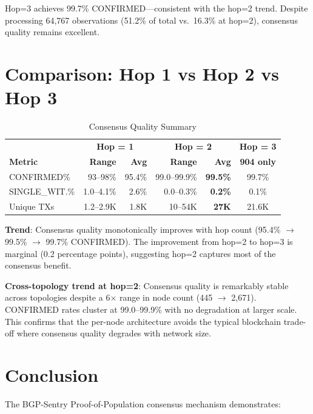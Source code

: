\documentclass[11pt,a4paper]{article}
\begin{document}
Hop=3 achieves 99.7\% CONFIRMED---consistent with the hop=2 trend. Despite
processing 64,767 observations (51.2\% of total vs.\ 16.3\% at hop=2), consensus
quality remains excellent.

\section{Comparison: Hop 1 vs Hop 2 vs Hop 3}

\begin{table}[H]
\centering
\caption{Consensus Quality Summary}
\begin{tabular}{lrrrrrr}
\toprule
 & \multicolumn{2}{c}{\textbf{Hop = 1}} & \multicolumn{2}{c}{\textbf{Hop = 2}} & \multicolumn{2}{c}{\textbf{Hop = 3}} \\
\textbf{Metric} & \textbf{Range} & \textbf{Avg} & \textbf{Range} & \textbf{Avg} & \multicolumn{2}{c}{\textbf{904 only}} \\
\midrule
CONFIRMED\%       & 93--98\% & 95.4\% & 99.0--99.9\% & \textbf{99.5\%} & \multicolumn{2}{c}{99.7\%} \\
SINGLE\_WIT.\%    & 1.0--4.1\%   & 2.6\%  & 0.0--0.3\%   & \textbf{0.2\%} & \multicolumn{2}{c}{0.1\%} \\
Unique TXs        & 1.2--2.9K    & 1.8K   & 10--54K      & \textbf{27K}   & \multicolumn{2}{c}{21.6K} \\
\bottomrule
\end{tabular}
\end{table}

\textbf{Trend}: Consensus quality monotonically improves with hop count
(95.4\% $\to$ 99.5\% $\to$ 99.7\% CONFIRMED). The improvement from hop=2 to hop=3
is marginal (0.2 percentage points), suggesting hop=2 captures most of the
consensus benefit.

\textbf{Cross-topology trend at hop=2}: Consensus quality is remarkably
stable across topologies despite a 6$\times$ range in node count (445 $\to$ 2,671).
CONFIRMED rates cluster at 99.0--99.9\% with no degradation at larger scale.
This confirms that the per-node architecture avoids the typical blockchain
trade-off where consensus quality degrades with network size.

\section{Conclusion}

The BGP-Sentry Proof-of-Population consensus mechanism demonstrates:
\end{document}
